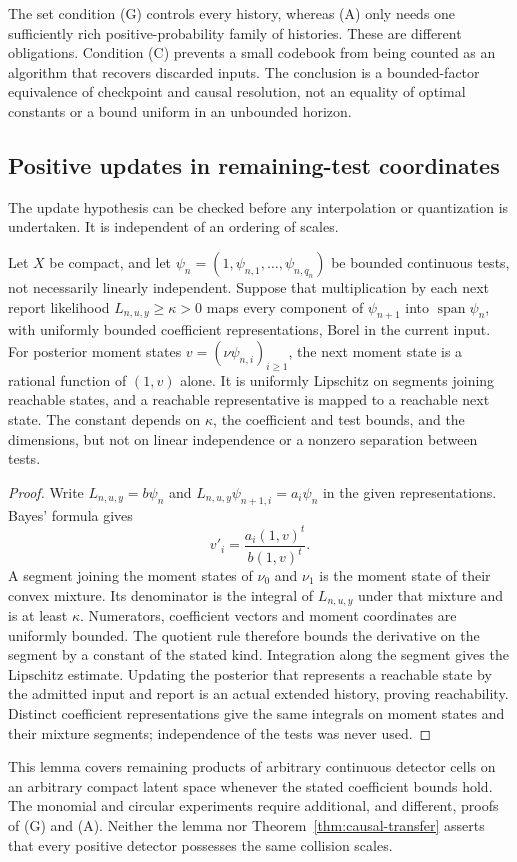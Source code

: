 The set condition (G) controls every history, whereas (A) only needs
one sufficiently rich positive-probability family of histories. These
are different obligations. Condition (C) prevents a small codebook from
being counted as an algorithm that recovers discarded inputs. The
conclusion is a bounded-factor equivalence of checkpoint and causal
resolution, not an equality of optimal constants or a bound uniform in
an unbounded horizon.

\subsection{Positive updates in remaining-test coordinates}
The update hypothesis can be checked before any interpolation or
quantization is undertaken. It is independent of an ordering of scales.

\begin{lemma}
\label{lem:positive-remaining-update}
Let $X$ be compact, and let
$\psi_n=(1,\psi_{n,1},\ldots,\psi_{n,q_n})$ be bounded continuous
tests, not necessarily linearly independent. Suppose that multiplication
by each next report likelihood $L_{n,u,y}\ge\kappa>0$ maps every
component of $\psi_{n+1}$ into $\operatorname{span}\psi_n$, with
uniformly bounded coefficient representations, Borel in the current
input. For posterior moment
states $v=(\nu\psi_{n,i})_{i\ge1}$, the next moment state is a
rational function of $(1,v)$ alone. It is uniformly Lipschitz on
segments joining reachable states, and a reachable representative is
mapped to a reachable next state. The constant depends on $\kappa$,
the coefficient and test bounds, and the dimensions, but not on linear
independence or a nonzero separation between tests.
\end{lemma}
\begin{proof}
Write $L_{n,u,y}=b\psi_n$ and
$L_{n,u,y}\psi_{n+1,i}=a_i\psi_n$ in the given representations.
Bayes' formula gives
\[
 v'_i=\frac{a_i(1,v)^t}{b(1,v)^t}.
\]
A segment joining the moment states of $\nu_0$ and $\nu_1$ is the
moment state of their convex mixture. Its denominator is the integral
of $L_{n,u,y}$ under that mixture and is at least $\kappa$.
Numerators, coefficient vectors and moment coordinates are uniformly
bounded. The quotient rule therefore bounds the derivative on the
segment by a constant of the stated kind. Integration along the
segment gives the Lipschitz estimate. Updating the posterior that
represents a reachable state by the admitted input and report is an
actual extended history, proving reachability. Distinct coefficient
representations give the same integrals on moment states and their
mixture segments; independence of the tests was never used.
\end{proof}

This lemma covers remaining products of arbitrary continuous detector
cells on an arbitrary compact latent space whenever the stated
coefficient bounds hold. The monomial and circular experiments require
additional, and different, proofs of (G) and (A). Neither the lemma nor
Theorem~\ref{thm:causal-transfer} asserts that every positive detector
possesses the same collision scales.
